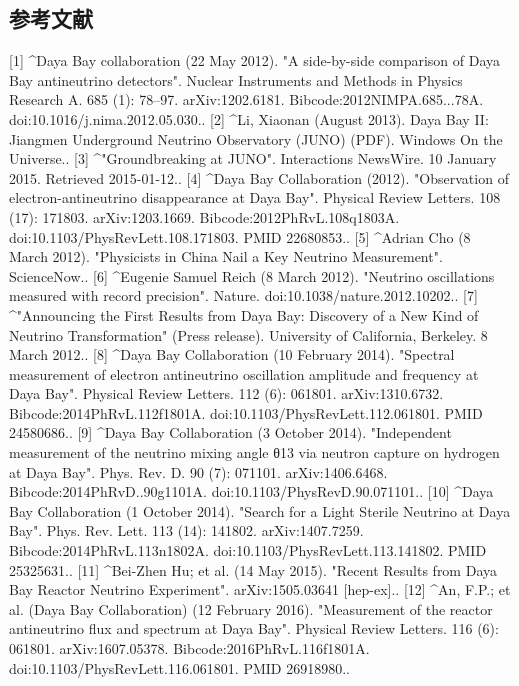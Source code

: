 \subsection{参考文献}
[1]
^Daya Bay collaboration (22 May 2012). "A side-by-side comparison of Daya Bay antineutrino detectors". Nuclear Instruments and Methods in Physics Research A. 685 (1): 78–97. arXiv:1202.6181. Bibcode:2012NIMPA.685...78A. doi:10.1016/j.nima.2012.05.030..
[2]
^Li, Xiaonan (August 2013). Daya Bay II: Jiangmen Underground Neutrino Observatory (JUNO) (PDF). Windows On the Universe..
[3]
^"Groundbreaking at JUNO". Interactions NewsWire. 10 January 2015. Retrieved 2015-01-12..
[4]
^Daya Bay Collaboration (2012). "Observation of electron-antineutrino disappearance at Daya Bay". Physical Review Letters. 108 (17): 171803. arXiv:1203.1669. Bibcode:2012PhRvL.108q1803A. doi:10.1103/PhysRevLett.108.171803. PMID 22680853..
[5]
^Adrian Cho (8 March 2012). "Physicists in China Nail a Key Neutrino Measurement". ScienceNow..
[6]
^Eugenie Samuel Reich (8 March 2012). "Neutrino oscillations measured with record precision". Nature. doi:10.1038/nature.2012.10202..
[7]
^"Announcing the First Results from Daya Bay: Discovery of a New Kind of Neutrino Transformation" (Press release). University of California, Berkeley. 8 March 2012..
[8]
^Daya Bay Collaboration (10 February 2014). "Spectral measurement of electron antineutrino oscillation amplitude and frequency at Daya Bay". Physical Review Letters. 112 (6): 061801. arXiv:1310.6732. Bibcode:2014PhRvL.112f1801A. doi:10.1103/PhysRevLett.112.061801. PMID 24580686..
[9]
^Daya Bay Collaboration (3 October 2014). "Independent measurement of the neutrino mixing angle θ13 via neutron capture on hydrogen at Daya Bay". Phys. Rev. D. 90 (7): 071101. arXiv:1406.6468. Bibcode:2014PhRvD..90g1101A. doi:10.1103/PhysRevD.90.071101..
[10]
^Daya Bay Collaboration (1 October 2014). "Search for a Light Sterile Neutrino at Daya Bay". Phys. Rev. Lett. 113 (14): 141802. arXiv:1407.7259. Bibcode:2014PhRvL.113n1802A. doi:10.1103/PhysRevLett.113.141802. PMID 25325631..
[11]
^Bei-Zhen Hu; et al. (14 May 2015). "Recent Results from Daya Bay Reactor Neutrino Experiment". arXiv:1505.03641 [hep-ex]..
[12]
^An, F.P.; et al. (Daya Bay Collaboration) (12 February 2016). "Measurement of the reactor antineutrino flux and spectrum at Daya Bay". Physical Review Letters. 116 (6): 061801. arXiv:1607.05378. Bibcode:2016PhRvL.116f1801A. doi:10.1103/PhysRevLett.116.061801. PMID 26918980..